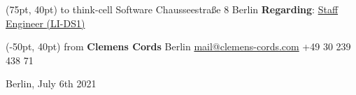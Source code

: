 \documentclass[11pt]{article}
\newcommand{\muted}{\color{muted_grey}}
\begin{document}

\begin{textblock*}{\paperwidth}(75pt, 40pt)
\flushleft
\:\newline
{\muted \small to}\linebreak
think-cell Software\linebreak
Chausseestra{\ss}e 8  Berlin \linebreak
\newline
\textbf{Regarding}: \href{https://careers.dolby.com/job/Berlin-Staff-Engineer-%28fmd%29/740864600/}{Staff Engineer {\muted(LI-DS1)}}
\end{textblock*}

\begin{textblock*}{\paperwidth}(-50pt, 40pt)
\flushright
{\muted \small from}\linebreak
{\Large \textbf{Clemens Cords}} Berlin\linebreak
\newline
\href{mailto:mail@clemens-cords.com}{mail@clemens-cords.com}\linebreak
+49 30 239 438 71 \linebreak
\newline
\newline
\end{textblock*}

\begin{flushright}
Berlin, July 6th 2021
\end{flushright}
\end{document}
